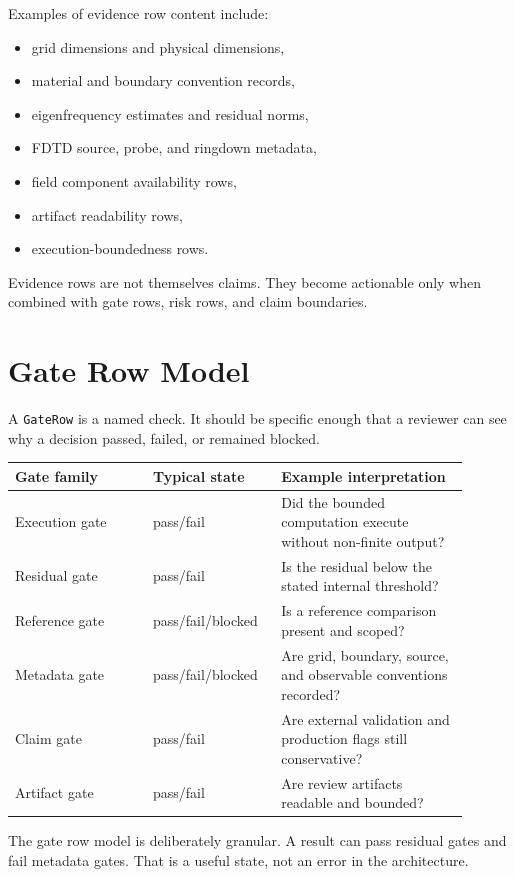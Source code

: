 \documentclass[11pt,a4paper]{article}
\newcommand{\code}[1]{\texttt{#1}}
\begin{document}
Examples of evidence row content include:

\begin{itemize}
  \item grid dimensions and physical dimensions,
  \item material and boundary convention records,
  \item eigenfrequency estimates and residual norms,
  \item FDTD source, probe, and ringdown metadata,
  \item field component availability rows,
  \item artifact readability rows,
  \item execution-boundedness rows.
\end{itemize}

Evidence rows are not themselves claims. They become actionable only when combined with gate rows, risk rows, and claim boundaries.

\section{Gate Row Model}
\label{sec:gate-row-model}

A \code{GateRow} is a named check. It should be specific enough that a reviewer can see why a decision passed, failed, or remained blocked.

\begin{longtable}{p{0.28\linewidth}p{0.24\linewidth}p{0.38\linewidth}}
\toprule
\textbf{Gate family} & \textbf{Typical state} & \textbf{Example interpretation}\\
\midrule
\endhead
Execution gate & pass/fail & Did the bounded computation execute without non-finite output?\\
Residual gate & pass/fail & Is the residual below the stated internal threshold?\\
Reference gate & pass/fail/blocked & Is a reference comparison present and scoped?\\
Metadata gate & pass/fail/blocked & Are grid, boundary, source, and observable conventions recorded?\\
Claim gate & pass/fail & Are external validation and production flags still conservative?\\
Artifact gate & pass/fail & Are review artifacts readable and bounded?\\
\bottomrule
\end{longtable}

The gate row model is deliberately granular. A result can pass residual gates and fail metadata gates. That is a useful state, not an error in the architecture.
\end{document}
